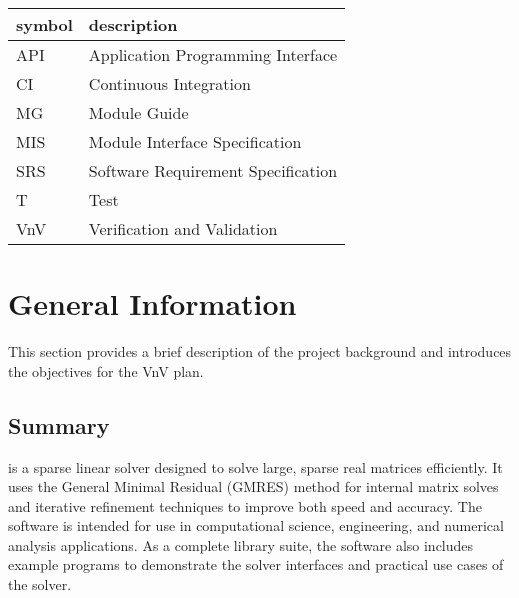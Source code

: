 \documentclass[12pt, titlepage]{article}
\begin{document}
\renewcommand{\arraystretch}{1.2}
\begin{tabular}{l l}
  \toprule
  \textbf{symbol} & \textbf{description}                     \\
  \midrule
  API       & Application Programming Interface  \\
  CI        & Continuous Integration             \\
  MG        & Module Guide                       \\
  MIS       & Module Interface Specification     \\
  SRS       & Software Requirement Specification \\
  T         & Test                               \\
  VnV       & Verification and Validation        \\
  \bottomrule
\end{tabular}



\newpage


\section{General Information}

This section provides a brief description of the project background and
introduces the objectives for the VnV plan.

\subsection{Summary}


\progname{} is a sparse linear solver designed to solve large, sparse real
matrices efficiently. It uses the General Minimal Residual (GMRES) method for
internal matrix solves and iterative refinement techniques to improve both speed
and accuracy. The software is intended for use in computational science,
engineering, and numerical analysis applications. As a complete library suite,
the software also includes example programs to demonstrate the solver interfaces
and practical use cases of the solver.
\end{document}

